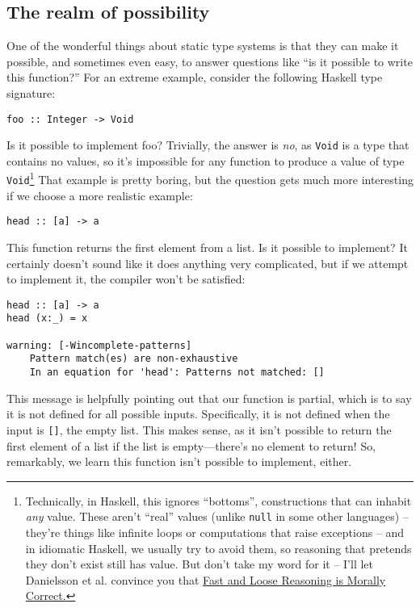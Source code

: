 \subsection{The realm of possibility}

One of the wonderful things about static type systems is that they can make it possible, and sometimes even easy, to answer questions like ``is it possible to write this function?'' For an extreme example, consider the following Haskell type signature:

\begin{verbatim}
foo :: Integer -> Void
\end{verbatim}
Is it possible to implement foo? Trivially, the answer is \textit{no}, as \texttt{Void} is a type that contains no values, so it's impossible for any function to produce a value of type \texttt{Void}\footnote{Technically, in Haskell, this ignores ``bottoms'', constructions that can inhabit \textit{any} value. These aren't ``real'' values (unlike \texttt{null} in some other languages) -- they're things like infinite loops or computations that raise exceptions -- and in idiomatic Haskell, we usually try to avoid them, so reasoning that pretends they don't exist still has value. But don't take my word for it -- I'll let Danielsson et al. convince you that \href{https://www.cs.ox.ac.uk/jeremy.gibbons/publications/fast+loose.pdf}{Fast and Loose Reasoning is Morally Correct.}} That example is pretty boring, but the question gets much more interesting if we choose a more realistic example:

\begin{verbatim}
head :: [a] -> a
\end{verbatim}
This function returns the first element from a list. Is it possible to implement? It certainly doesn't sound like it does anything very complicated, but if we attempt to implement it, the compiler won't be satisfied:

\begin{verbatim}
head :: [a] -> a
head (x:_) = x

warning: [-Wincomplete-patterns]
    Pattern match(es) are non-exhaustive
    In an equation for 'head': Patterns not matched: []
\end{verbatim}
This message is helpfully pointing out that our function is partial, which is to say it is not defined for all possible inputs. Specifically, it is not defined when the input is \texttt{[]}, the empty list. This makes sense, as it isn't possible to return the first element of a list if the list is empty—there's no element to return! So, remarkably, we learn this function isn't possible to implement, either.



